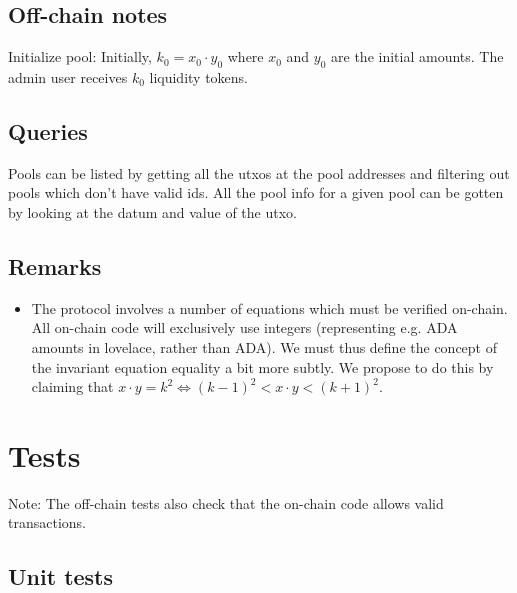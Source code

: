 \documentclass{article}
\begin{document}
\subsection{Off-chain notes}

Initialize pool: Initially, $k_0 = x_0 \cdot y_0$ where $x_0$ and $y_0$ are the
initial amounts. The admin user receives $k_0$ liquidity tokens.

\subsection{Queries}

Pools can be listed by getting all the utxos at the pool addresses and filtering
out pools which don't have valid ids. All the pool info for a given pool
can be gotten by looking at the datum and value of the utxo.

\subsection{Remarks}

\begin{itemize}
  \item The protocol involves a number of equations which must be verified
    on-chain. All on-chain code will exclusively use integers (representing e.g.
    ADA amounts in lovelace, rather than ADA). We must thus define the concept
    of the invariant equation equality a bit more subtly. We propose to do this
    by claiming that $x \cdot y = k^2 \Leftrightarrow (k-1)^2 < x \cdot y <
    (k+1)^2$.
\end{itemize}

\section{Tests}


Note: The off-chain tests also check that the on-chain code allows valid
transactions.


\subsection{Unit tests}
\end{document}
